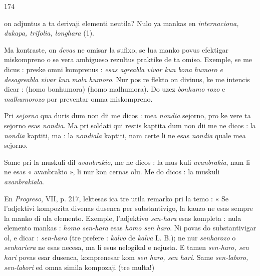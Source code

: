 \begin{VUpage}[178]{174}

\VUcontinue
on adjuntus a ta derivaji elementi neutila? Nulo ya mankas\nl
en \textit{internaciona, dukapa, trifolia, longhara} (1).

Ma kontraste, on \textit{devas} ne omisar la sufixo, se lua manko\nl
povus efektigar miskompreno o se vera ambigueso rezultus\nl
praktike de ta omiso. Exemple, se me dicus : \nl
{}\nl
preske omni komprenus : \textit{esas agreabla vivar kun bona}\nl
\textit{humoro e desagreabla vivar kun mala humoro}. Nur pos re\cc
flekto on divinus, ke me intencis dicar : \nl
{} (homo bonhumora) \nl
{} (homo malhumora). Do uzez \textit{bonhumo}\cc
\textit{rozo} e \textit{malhumorozo} por preventar omna miskompreno.

Pri \textit{sejorno} qua duris dum non dii me dicos : mea \textit{nondia}\nl
sejorno, pro ke vere ta sejorno esas \textit{nondia}. Ma pri soldati\nl
qui restis kaptita dum non dii me ne dicos : la \textit{nondia} kaptiti,\nl
ma : la \textit{nondiala} kaptiti, nam certe li ne esas \textit{nondia} quale\nl
mea sejorno.

Same pri la muskuli dil \textit{avanbrakio}, me ne dicos : la mus\cc
kuli \textit{avanbrakia}, nam li ne esas « avanbrakio », li nur kon\cc
cernas olu. Me do dicos : la muskuli \textit{avanbrakiala}.

En \textit{Progreso}, VII, p. 217, lektesas ica tre utila remarko\nl
pri la temo : « Se l'adjektivi kompozita divenas dusenca\nl
per substantivigo, la kauzo ne esas sempre la manko di ula\nl
elemento. Exemple, l'adjektivo \textit{sen-hara} esas kompleta : nula\nl
elemento mankas : \textit{homo sen-hara} esas \textit{homo sen haro}. Ni\nl
povas do substantivigar ol, e dicar : \textit{sen-haro} (tre prefere :\nl
\textit{kalvo} de \textit{kalva} L. B.); ne nur \textit{senharozo} o \textit{senhariera} ne esas\nl
necesa, ma li esus nelogikal e nejusta. E tamen \textit{sen-haro, sen}\cc
\textit{hari} povas esar dusenca, komprenesar kom \textit{sen haro, sen hari}.\nl
Same \textit{sen-laboro, sen-labori} ed omna simila kompozaji (tre\nl
multa!)
\end{VUpage}


